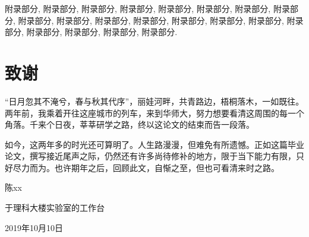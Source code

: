 \documentclass[UTF8,openright]{ctexbook}
\begin{document}
\newpage 

附录部分, 附录部分, 附录部分, 附录部分, 附录部分,
附录部分, 附录部分, 附录部分, 附录部分, 附录部分,
附录部分, 附录部分, 附录部分, 附录部分, 附录部分,
附录部分, 附录部分, 附录部分, 附录部分, 附录部分.






\clearpage{\pagestyle{fancy}\cleardoublepage}
\chapter*{致谢}

\linespread{1.4}\selectfont


“日月忽其不淹兮，春与秋其代序”，丽娃河畔，共青路边，梧桐落木，一如既往。两年前，我乘着开往这座城市的列车，来到华师大，努力想要看清这周围的每一个角落。千来个日夜，莘莘研学之路，终以这论文的结束而告一段落。


如今，这两年多的时光还可算明了。人生路漫漫，但难免有所遗憾。正如这篇毕业论文，撰写接近尾声之际，仍然还有许多尚待修补的地方，限于当下能力有限，只好尽力而为。也许期年之后，回顾此文，自惭之至，但也可看清来时之路。



\begin{flushright}
陈xx

于理科大楼实验室的工作台

2019年10月10日
\end{flushright}



\iffalse  %

\clearpage{\pagestyle{fancy}\cleardoublepage}
\chapter*{研究成果}
\addcontentsline{toc}{chapter}{研究成果}

软件蓍作权：基于xxxx系统 V1.0

\fi
\end{document}
